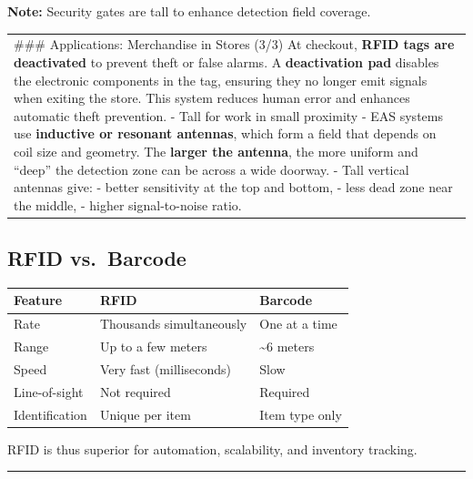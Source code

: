 \documentclass[a4paper, 12pt]{book} %
\begin{document}
\textbf{Note:} Security gates are tall to enhance detection field
coverage.

\begin{longtable}[]{@{}
  >{\raggedright\arraybackslash}p{}@{}}
\toprule\noalign{}
\endhead
\bottomrule\noalign{}
\endlastfoot
\#\#\# Applications: Merchandise in Stores (3/3) At checkout,
\textbf{RFID tags are deactivated} to prevent theft or false alarms. A
\textbf{deactivation pad} disables the electronic components in the tag,
ensuring they no longer emit signals when exiting the store. This system
reduces human error and enhances automatic theft prevention.
\pandocbounded{\begin{figure}[h]
\centering
\fbox{Missing Image: Pasted image 20251014085939.png}
\end{figure}}
- Tall for work in small proximity - EAS systems use \textbf{inductive
or resonant antennas}, which form a field that depends on coil size and
geometry. The \textbf{larger the antenna}, the more uniform and ``deep''
the detection zone can be across a wide doorway. - Tall vertical
antennas give: - better sensitivity at the top and bottom, - less dead
zone near the middle, - higher signal-to-noise ratio. \\
\end{longtable}

\subsection{RFID vs.~Barcode}\label{rfid-vs.-barcode}

\begin{longtable}[]{@{}lll@{}}
\toprule\noalign{}
Feature & RFID & Barcode \\
\midrule\noalign{}
\endhead
\bottomrule\noalign{}
\endlastfoot
Rate & Thousands simultaneously & One at a time \\
Range & Up to a few meters & \textasciitilde6 meters \\
Speed & Very fast (milliseconds) & Slow \\
Line-of-sight & Not required & Required \\
Identification & Unique per item & Item type only \\
\end{longtable}

RFID is thus superior for automation, scalability, and inventory
tracking.

\begin{center}\rule{0.5\linewidth}{0.5pt}\end{center}
\end{document}
